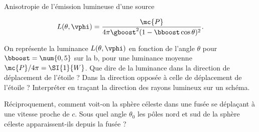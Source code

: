 \begin{exo}[PC][3][TD]{Anisotropie de l'émission lumineuse d'une source}
\begin{quest}
    \begin{equation}
      L(\theta,\vphi) = \frac{\mc{P}}{4\pi\gboost^2(1 -\bboost \cos \theta)^2}.
    \end{equation}

    \item On représente la luminance $L(\theta,\vphi)$ en fonction de l'angle $\theta$ pour $\bboost = \num{0,5}$ sur la b, pour une luminance moyenne $\mc{P}/4\pi=\SI{1}{W}$. Que dire de la luminance dans la direction de déplacement de l'étoile ? Dans la direction opposée à celle de déplacement de l'étoile ? Interpréter en traçant la direction des rayons lumineux sur un schéma. 
    \item Réciproquement, comment voit-on la sphère céleste dans une fusée se déplaçant à une vitesse proche de $c$. Sous quel angle $\theta_0$ les pôles nord et sud de la sphère céleste apparaissent-ils depuis la fusée ? 
  \end{quest}  


\end{exo}


